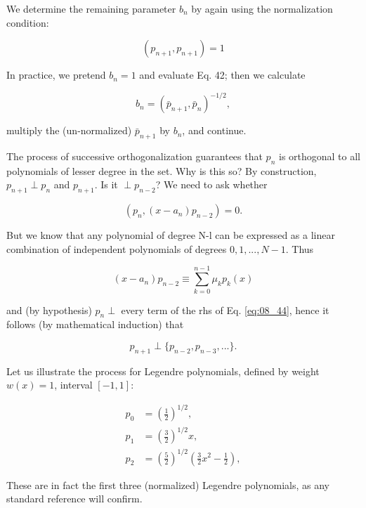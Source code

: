 We determine the remaining parameter $b_{n}$ by again using the normalization condition:

\begin{equation*}
(p_{n+1} , p_{n+1}) = 1
\end{equation*}

In practice, we pretend $b_{n}=1$ and evaluate Eq. 42; then we calculate

\begin{equation}
b_{n} = ( \bar{p}_{n+1}, \bar{p}_{n})^{-1/2},
\end{equation}

multiply the (un-normalized) $\bar{p}_{n+1}$ by $b_{n}$, and continue.

The process of successive orthogonalization guarantees that $p_{n}$ is orthogonal to all polynomials of lesser degree in the set. Why is this so? By construction, $p_{n+1} \perp p_{n}$ and $p_{n+1}$. Is it $\perp p_{n-2}$? We need to ask whether

\begin{equation*}
(p_{n}, (x-a_{n})p_{n-2}) = 0.
\end{equation*}

But we know that any polynomial of degree N-l can be expressed as a linear combination of independent polynomials of degrees $0, 1, ... , N-1$. Thus

\begin{equation}\label{eq:08_44}
(x - a_{n}) p_{n-2} \equiv \sum_{k=0}^{n-1} \mu_{k} p_{k}(x)
\end{equation}

and (by hypothesis) $p_{n} \perp$ every term of the rhs of Eq. \ref{eq:08_44}, hence it follows (by mathematical induction) that

\begin{equation}
p_{n+1} \perp \{ p_{n-2} , p_{n-3} , ... \}.
\end{equation}

Let us illustrate the process for Legendre polynomials, defined by weight $w(x) = 1$, interval $[-1,1]$:

\begin{align*}
p_{0} & = (\frac{1}{2})^{1/2} , \\
p_{1} & = (\frac{3}{2})^{1/2} x , \\
p_{2} & = (\frac{5}{2})^{1/2} (\frac{3}{2}x^{2} - \frac{1}{2}) ,
\end{align*}

These are in fact the first three (normalized) Legendre polynomials, as any standard reference will confirm.

